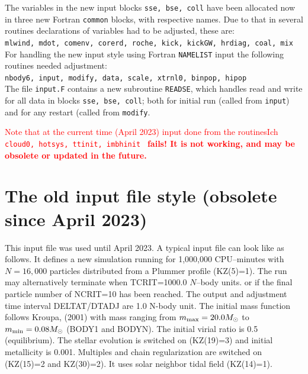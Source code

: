 The variables in the new input blocks {\tt sse, bse, coll} have been allocated now in three new Fortran {\tt common} blocks, with respective names. Due to that in several routines declarations of variables had to be adjusted, these are: \\[0.5cm]
\noindent
{\tt mlwind, mdot, comenv, corerd, roche, kick, kickGW, hrdiag, coal, mix}
 \\[0.5cm]
For handling the new input style using Fortran {\tt NAMELIST} input the following routines needed adjustment: \\[0.5cm]
\noindent
{\tt nbody6, input, modify, data, scale, xtrnl0, binpop, hipop}
\\[0.5cm]
The file {\tt input.F} contains a new subroutine {\tt READSE}, which handles read and write for all data in blocks {\tt sse, bse, coll}; both for initial run (called from {\tt input}) and for any restart (called from {\tt modify}.

\textcolor{red}{
Note that at the current time (April 2023) input done from the routinesIch 
{\tt cloud0, hotsys, ttinit, imbhinit }
{\bf fails! It is not working, and may be obsolete or updated in the future.}}


\section*{The old input file style (obsolete since April 2023)}

This input file was used until April 2023.
A typical input file can look like as follows.
It defines a new simulation running for 1,000,000 CPU--minutes
with $N=16,000$ particles distributed from a Plummer profile
(KZ(5)=1).
The run may alternatively terminate when TCRIT=1000.0 $N$--body units.
or if the final particle number of NCRIT=10 has been reached.
The output and adjustment time interval DELTAT/DTADJ are 1.0 N-body unit.
The initial mass function follows Kroupa, (2001) with mass ranging
from $m_{\rm max}=20.0 M_{\odot}$ to $m_{\rm min}=0.08 M_{\odot}$ (BODY1 and BODYN).
The initial virial ratio is 0.5 (equilibrium). The stellar 
evolution is switched on (KZ(19)=3) and initial metallicity is 0.001. 
Multiples and chain regularization are switched on (KZ(15)=2 and KZ(30)=2).
It uses solar neighbor tidal field (KZ(14)=1). 

